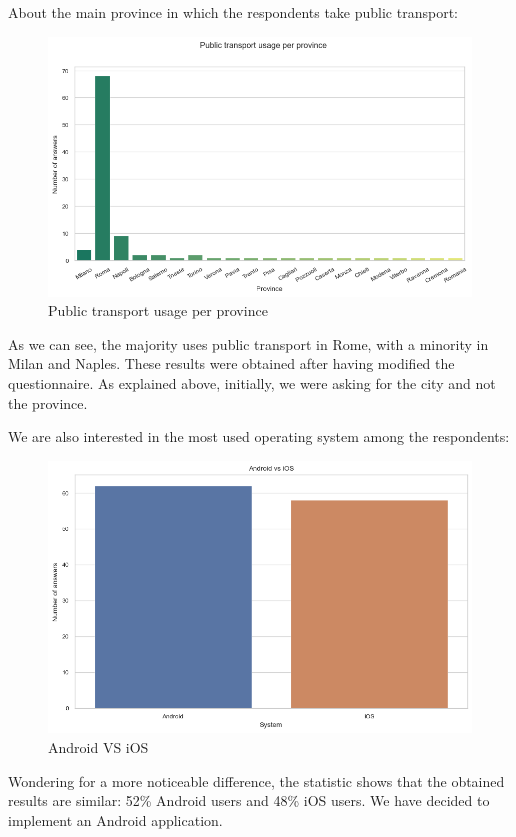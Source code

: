 \documentclass[a4paper, 11pt]{report}
\begin{document}
About the main province in which the respondents take public transport:

\begin{figure}[H]
	\centering
 	\includegraphics[width=.8\textwidth]{img/analysis/public_transport_usage_per_province.png}
 	\caption{Public transport usage per province}
\end{figure}

As we can see, the majority uses public transport in Rome, with a minority in Milan and Naples. These results were obtained after having modified 
the questionnaire. As explained above, initially, we were asking for the city and not the province. 


We are also interested in the most used operating system among the respondents: 
\begin{figure}[H]
	\centering
 	\includegraphics[width=.5\textwidth]{img/analysis/android_v_ios.png}
 	\caption{Android VS iOS}
\end{figure}

Wondering for a more noticeable difference, the statistic shows that the obtained results are similar: 52\% Android users and 48\% iOS users.  
We have decided to implement an Android application.
\end{document}
